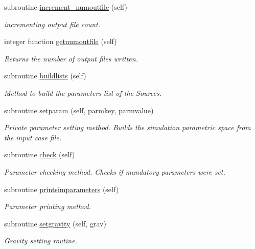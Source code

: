 \begin{DoxyCompactItemize}
subroutine \mbox{\hyperlink{namespacesimulationglobals__mod_a77d7175bc03e472ee9a00ee9f6ff1b0e}{increment\+\_\+numoutfile}} (self)
\begin{DoxyCompactList}\small\item\em incrementing output file count. \end{DoxyCompactList}\item 
integer function \mbox{\hyperlink{namespacesimulationglobals__mod_a2b76dc3e6cbf1256253c54903df8393b}{getnumoutfile}} (self)
\begin{DoxyCompactList}\small\item\em Returns the number of output files written. \end{DoxyCompactList}\item 
subroutine \mbox{\hyperlink{namespacesimulationglobals__mod_a20a4476e2a8dbec4c1aaa202a14b4a40}{buildlists}} (self)
\begin{DoxyCompactList}\small\item\em Method to build the parameters list of the Sources. \end{DoxyCompactList}\item 
subroutine \mbox{\hyperlink{namespacesimulationglobals__mod_ada0b6ffc5e112afbd86cdaa8d9aa55d8}{setparam}} (self, parmkey, parmvalue)
\begin{DoxyCompactList}\small\item\em Private parameter setting method. Builds the simulation parametric space from the input case file. \end{DoxyCompactList}\item 
subroutine \mbox{\hyperlink{namespacesimulationglobals__mod_a3d337e9c28136dd9c67fa576f05cd44b}{check}} (self)
\begin{DoxyCompactList}\small\item\em Parameter checking method. Checks if mandatory parameters were set. \end{DoxyCompactList}\item 
subroutine \mbox{\hyperlink{namespacesimulationglobals__mod_ab67964fe7c3fb20a4ce0b4193520aa1d}{printsimparameters}} (self)
\begin{DoxyCompactList}\small\item\em Parameter printing method. \end{DoxyCompactList}\item 
subroutine \mbox{\hyperlink{namespacesimulationglobals__mod_ae6b88d15ddc389aedd73d600de0337df}{setgravity}} (self, grav)
\begin{DoxyCompactList}\small\item\em Gravity setting routine. \end{DoxyCompactList}\item 

\end{DoxyCompactItemize}
